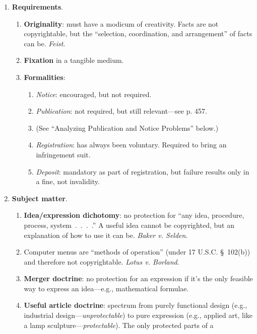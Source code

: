 \begin{enumerate}
    \item \textbf{Requirements}.
    \begin{enumerate}
        \item \textbf{Originality}: must have a modicum of creativity. Facts 
        are not copyrightable, but the ``selection, coordination, and 
        arrangement'' of facts can be. \emph{Feist}.
        \item \textbf{Fixation} in a tangible medium.
        \item \textbf{Formalities}:
        \begin{enumerate}
            \item \emph{Notice}: encouraged, but not required.
            \item \emph{Publication}: not required, but still relevant---see 
            p. 457.
            \item (See ``Analyzing Publication and Notice Problems'' below.)
            \item \emph{Registration}: has always been voluntary. Required to 
            bring an infringement suit.
            \item \emph{Deposit}: mandatory as part of registration, but 
            failure results only in a fine, not invalidity.
        \end{enumerate}
    \end{enumerate}
    \item \textbf{Subject matter}.
    \begin{enumerate}
        \item \textbf{Idea/expression dichotomy}: no protection for ``any 
        idea, procedure, process, system~.~.~.~.'' A useful idea cannot be 
        copyrighted, but an explanation of how to use it can be. \emph{Baker 
        v. Selden}.
        \item Computer menus are ``methods of operation'' (under 17 U.S.C. \S\ 
        102(b)) and therefore not copyrightable. \emph{Lotus v. Borland}.
        \item \textbf{Merger doctrine}: no protection for an expression if 
        it's the only feasible way to express an idea---e.g., mathematical 
        formulae.
        \item \textbf{Useful article doctrine}: spectrum from purely 
        functional design (e.g., industrial design---\emph{unprotectable}) to 
        pure expression (e.g., applied art, like a lamp 
        sculpture---\emph{protectable}). The only protected parts of a 

\end{enumerate}
\end{enumerate}
